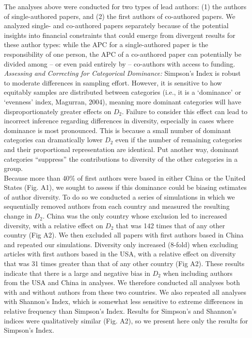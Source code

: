 \documentclass[
  english,
  man]{apa6}
\begin{document}
The analyses above were conducted for two types of lead authors: (1) the authors of single-authored papers, and (2) the first authors of co-authored papers. We analyzed single- and co-authored papers separately because of the potential insights into financial constraints that could emerge from divergent results for these author types: while the APC for a single-authored paper is the responsibility of one person, the APC of a co-authored paper can potentially be divided among -- or even paid entirely by -- co-authors with access to funding.\\
\emph{Assessing and Correcting for Categorical Dominance:} Simpson's Index is robust to moderate differences in sampling effort. However, it is sensitive to how equitably samples are distributed between categories (i.e., it is a {`dominance'} or {`evenness'} index, Magurran, 2004), meaning more dominant categories will have disproportionately greater effects on \(D_{2}\). Failure to consider this effect can lead to incorrect inference regarding differences in diversity, especially in cases where dominance is most pronounced. This is because a small number of dominant categories can dramatically lower \(D_{2}\) even if the number of remaining categories and their proportional representation are identical. Put another way, dominant categories ``suppress'' the contributions to diversity of the other categories in a group.\\
Because more than 40\% of first authors were based in either China or the United States (Fig. A1), we sought to assess if this dominance could be biasing estimates of author diversity. To do so we conducted a series of simulations in which we sequentially removed authors from each country and measured the resulting change in \(D_{2}\). China was the only country whose exclusion led to increased diversity, with a relative effect on \(D_{2}\) that was 142 times that of any other country (Fig A2). We then excluded all papers with first authors based in China and repeated our simulations. Diversity only increased (8-fold) when excluding articles with first authors based in the USA, with a relative effect on diversity that was 31 times greater than that of any other country (Fig A2). These results indicate that there is a large and negative bias in \(D_{2}\) when including authors from the USA and China in analyses. We therefore conducted all analyses both with and without authors from these two countries. We also repeated all analyses with Shannon's Index, which is somewhat less sensitive to extreme differences in relative frequency than Simpson's Index. Results for Simpson's and Shannon's indices were qualitatively similar (Fig. A2), so we present here only the results for Simpson's Index.\\
\end{document}
